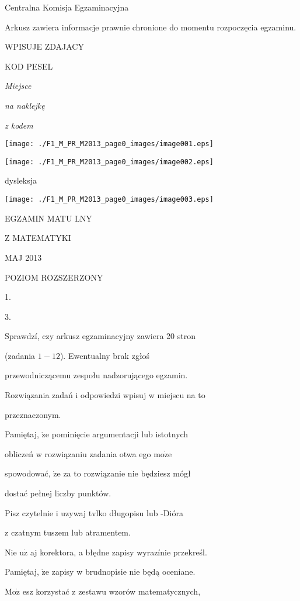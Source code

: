 \documentclass[a4paper,12pt]{article}
\begin{document}
Centralna Komisja Egzaminacyjna

Arkusz zawiera informacje prawnie chronione do momentu rozpoczęcia egzaminu.

WPISUJE ZDAJACY

KOD PESEL

{\it Miejsce}

{\it na naklejkę}

{\it z kodem}
\begin{center}
\texttt{[image: ./F1\_M\_PR\_M2013\_page0\_images/image001.eps]}

\texttt{[image: ./F1\_M\_PR\_M2013\_page0\_images/image002.eps]}
\end{center}
\fbox{} dysleksja
\begin{center}
\texttt{[image: ./F1\_M\_PR\_M2013\_page0\_images/image003.eps]}
\end{center}
EGZAMIN MATU LNY

Z MATEMATYKI

MAJ 2013

POZIOM ROZSZERZONY

1.

3.

Sprawdzí, czy arkusz egzaminacyjny zawiera 20 stron

(zadania $1-12$). Ewentualny brak zgłoś

przewodniczącemu zespołu nadzorującego egzamin.

Rozwiązania zadań i odpowiedzi wpisuj w miejscu na to

przeznaczonym.

Pamiętaj, $\dot{\mathrm{z}}\mathrm{e}$ pominięcie argumentacji lub istotnych

obliczeń w rozwiązaniu zadania otwa ego $\mathrm{m}\mathrm{o}\dot{\mathrm{z}}\mathrm{e}$

spowodować, $\dot{\mathrm{z}}\mathrm{e}$ za to rozwiązanie nie będziesz mógł

dostać pełnej liczby punktów.

Pisz czytelnie i uzywaj tvlko długopisu lub -Dióra

z czatnym tuszem lub atramentem.

Nie $\mathrm{u}\dot{\mathrm{z}}$ aj korektora, a błędne zapisy wyrazínie przekreśl.

Pamiętaj, $\dot{\mathrm{z}}\mathrm{e}$ zapisy w brudnopisie nie będą oceniane.

$\mathrm{M}\mathrm{o}\dot{\mathrm{z}}$ esz korzystać z zestawu wzorów matematycznych,
\end{document}
